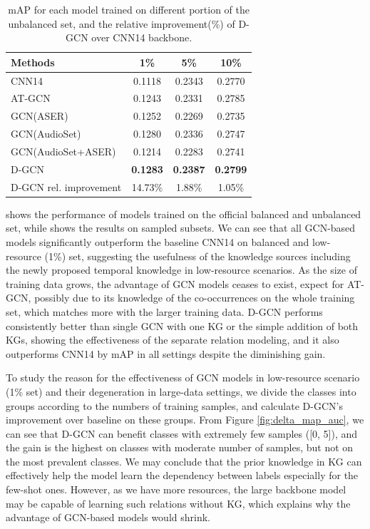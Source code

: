 \begin{table}[tbp]
  \setlength{\belowcaptionskip}{-0.cm}
  \centering
  \small

  \begin{tabular}{lccc}
      \hline
      Methods &     1\% &     5\% &    10\% \\
      \hline
      CNN14                 & 0.1118 & 0.2343 & 0.2770 \\
      \hline
      AT-GCN                & 0.1243 & 0.2331 & 0.2785 \\
      GCN(ASER)             & 0.1252 & 0.2269 & 0.2735 \\
      GCN(AudioSet)         & 0.1280 & 0.2336 & 0.2747 \\
      GCN(AudioSet+ASER)    & 0.1214 & 0.2283 & 0.2741 \\
      D-GCN  & \textbf{0.1283} & \textbf{0.2387} & \textbf{0.2799} \\
      \hline
      D-GCN rel. improvement & 14.73\% & 1.88\% & 1.05\% \\
      \hline
  \end{tabular}   
  \caption{\label{tab:low-resource-map} mAP for each model trained on different portion of the unbalanced set, and the relative improvement(\%) of D-GCN over CNN14 backbone.}
  \vspace{-4mm}
\end{table}


 shows the performance of models trained on the official balanced and unbalanced set, while  shows the results on sampled subsets. We can see that all GCN-based models significantly outperform the baseline CNN14 on balanced and low-resource (1\%) set, suggesting the usefulness of the knowledge sources including the newly proposed temporal knowledge in low-resource scenarios. As the size of training data grows, the advantage of GCN models ceases to exist, expect for AT-GCN, possibly due to its knowledge of the co-occurrences on the whole training set, which matches more with the larger training data. D-GCN performs consistently better than single GCN with one KG or the simple addition of both KGs, showing the effectiveness of the separate relation modeling, and it also outperforms CNN14 by mAP in all settings despite the diminishing gain.

To study the reason for the effectiveness of GCN models in low-resource scenario (1\% set) and their degeneration in large-data settings, we divide the classes into groups according to the numbers of training samples, and calculate D-GCN's improvement over baseline on these groups. From Figure \ref{fig:delta_map_auc}, we can see that D-GCN can benefit classes with extremely few samples ([0, 5]), and the gain is the highest on classes with moderate number of samples, but not on the most prevalent classes. We may conclude that the prior knowledge in KG can effectively help the model learn the dependency between labels especially for the few-shot ones. However, as we have more resources, the large backbone model may be capable of learning such relations without KG, which explains why the advantage of GCN-based models would shrink.   

